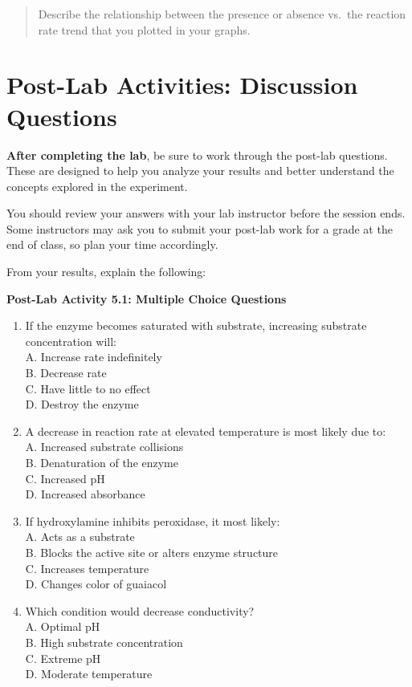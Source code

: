 \documentclass[
  letterpaper,
  DIV=11,
  numbers=noendperiod]{scrreprt}
\begin{document}
\begin{quote}
Describe the relationship between the presence or absence vs.~the
reaction rate trend that you plotted in your graphs.
\end{quote}

\section{\texorpdfstring{\textbf{Post-Lab Activities: Discussion
Questions}}{Post-Lab Activities: Discussion Questions}}\label{post-lab-activities-discussion-questions}

\textbf{After completing the lab}, be sure to work through the post-lab
questions. These are designed to help you analyze your results and
better understand the concepts explored in the experiment.

You should review your answers with your lab instructor before the
session ends. Some instructors may ask you to submit your post-lab work
for a grade at the end of class, so plan your time accordingly.

From your results, explain the following:

\textbf{Post-Lab Activity 5.1: Multiple Choice Questions}

\begin{enumerate}
\def\labelenumi{\arabic{enumi}.}
\item
  If the enzyme becomes saturated with substrate, increasing substrate
  concentration will:\\
  A. Increase rate indefinitely\\
  B. Decrease rate\\
  C. Have little to no effect\\
  D. Destroy the enzyme
\item
  A decrease in reaction rate at elevated temperature is most likely due
  to:\\
  A. Increased substrate collisions\\
  B. Denaturation of the enzyme\\
  C. Increased pH\\
  D. Increased absorbance
\item
  If hydroxylamine inhibits peroxidase, it most likely:\\
  A. Acts as a substrate\\
  B. Blocks the active site or alters enzyme structure\\
  C. Increases temperature\\
  D. Changes color of guaiacol
\item
  Which condition would decrease conductivity?\\
  A. Optimal pH\\
  B. High substrate concentration\\
  C. Extreme pH\\
  D. Moderate temperature
\end{enumerate}
\end{document}
